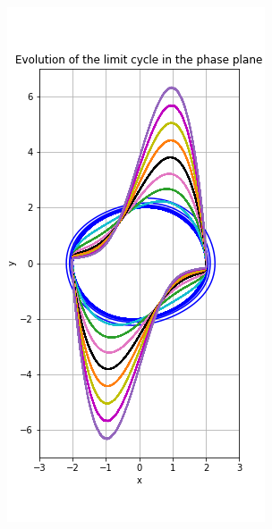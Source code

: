 \documentclass{article}
\begin{document}
\begin{figure}
\centering
\includegraphics[width=0.5\linewidth]{Image2.png}
\end{figure}
\end{document}
